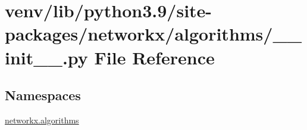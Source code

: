 \hypertarget{venv_2lib_2python3_89_2site-packages_2networkx_2algorithms_2____init_____8py}{}\section{venv/lib/python3.9/site-\/packages/networkx/algorithms/\+\_\+\+\_\+init\+\_\+\+\_\+.py File Reference}
\label{venv_2lib_2python3_89_2site-packages_2networkx_2algorithms_2____init_____8py}
\subsection*{Namespaces}
\begin{DoxyCompactItemize}
\item 
 \hyperlink{namespacenetworkx_1_1algorithms}{networkx.\+algorithms}
\end{DoxyCompactItemize}
